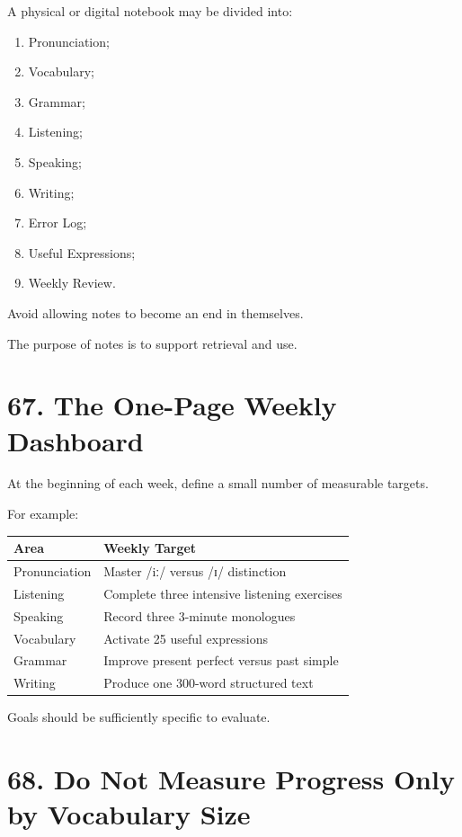 A physical or digital notebook may be divided into:

\begin{enumerate}
    \item Pronunciation;
    \item Vocabulary;
    \item Grammar;
    \item Listening;
    \item Speaking;
    \item Writing;
    \item Error Log;
    \item Useful Expressions;
    \item Weekly Review.
\end{enumerate}

Avoid allowing notes to become an end in themselves.

The purpose of notes is to support retrieval and use.

\section*{67. The One-Page Weekly Dashboard}

At the beginning of each week, define a small number of measurable targets.

For example:

\begin{center}
\begin{tabular}{|p{6cm}|p{7cm}|}
\hline
\textbf{Area} & \textbf{Weekly Target} \\
\hline
Pronunciation & Master /iː/ versus /ɪ/ distinction \\
\hline
Listening & Complete three intensive listening exercises \\
\hline
Speaking & Record three 3-minute monologues \\
\hline
Vocabulary & Activate 25 useful expressions \\
\hline
Grammar & Improve present perfect versus past simple \\
\hline
Writing & Produce one 300-word structured text \\
\hline
\end{tabular}
\end{center}

Goals should be sufficiently specific to evaluate.

\section*{68. Do Not Measure Progress Only by Vocabulary Size}

